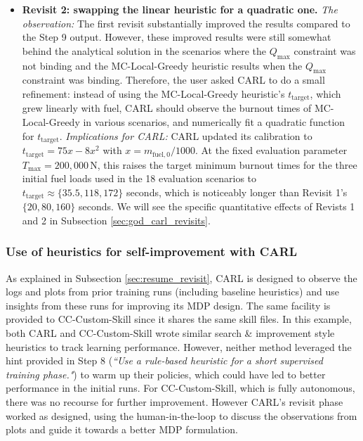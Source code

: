 \documentclass[mnsc,sglanonrev]{informs4}
\begin{document}
\begin{itemize}
\item \textbf{Revisit 2: swapping the linear heuristic for a quadratic one.} \emph{The observation:} The first revisit substantially improved the results compared to the Step 9 output. However, these improved results were still somewhat behind the analytical solution in the scenarios where the $Q_{\max}$ constraint was not binding and the MC-Local-Greedy heuristic results when the $Q_{\max}$ constraint was binding. Therefore, the user asked CARL to do a small refinement: instead of using the MC-Local-Greedy heuristic's $t_{\mathrm{target}}$, which grew linearly with fuel, CARL should observe the burnout times of MC-Local-Greedy in various scenarios, and numerically fit a quadratic function for $t_{\mathrm{target}}$. \emph{Implications for CARL: } CARL updated its calibration to $t_{\mathrm{target}} = 75x - 8x^2$ with $x = m_{\mathrm{fuel},0}/1000$.
At the fixed evaluation parameter $T_{\max}=200{,}000\,\mathrm{N}$, this raises the target minimum burnout times for the three initial fuel loads used in the 18 evaluation scenarios to $t_{\mathrm{target}}\approx\{35.5,118,172\}$ seconds, which is noticeably longer than Revisit 1's $\{20,80,160\}$ seconds. We will see the specific quantitative effects of Revists 1 and 2 in Subsection \ref{sec:god_carl_revisits}.
\end{itemize}
%
\subsubsection{Use of heuristics for self-improvement with CARL}

As explained in Subsection \ref{sec:resume_revisit}, CARL is designed to observe the logs and plots from prior training runs (including baseline heuristics) and use insights from these runs for improving its MDP design. The same facility is provided to CC-Custom-Skill since it shares the same skill files. In this example, both CARL and CC-Custom-Skill wrote similar search \& improvement style heuristics to track learning performance. However, neither method leveraged the hint provided in Step 8 (\emph{``Use a rule-based heuristic for a short supervised training phase."}) to warm up their policies, which could have led to better performance in the initial runs. For CC-Custom-Skill, which is fully autonomous, there was no recourse for further improvement. However CARL's revisit phase worked as designed, using the human-in-the-loop to discuss the observations from plots and guide it towards a better MDP formulation.
\end{document}
